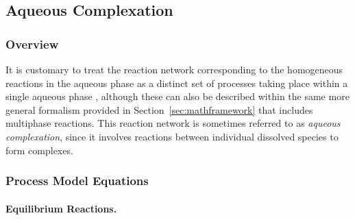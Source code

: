 \subsection{Aqueous Complexation} \label{sec:AqueousComplexation}

\subsubsection{Overview}

It is customary to treat the reaction network corresponding to the homogeneous reactions 
in the aqueous phase as a distinct set of processes taking place within a single aqueous phase \citep{steefel_1996}, 
although these can also be described within the same more general formalism provided in Section~\ref{sec:mathframework} 
that includes multiphase reactions.  
This reaction network is sometimes referred to as \textit{aqueous complexation}, 
since it involves reactions between individual dissolved species to form complexes.  

\subsubsection{Process Model Equations} \label{sec:aqueous-complexation-eq}

\paragraph{Equilibrium Reactions.} 

